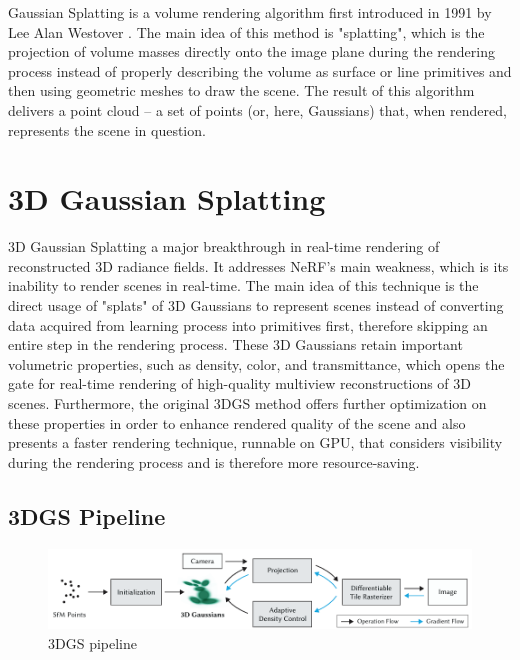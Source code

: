Gaussian Splatting is a volume rendering algorithm first introduced in 1991 by Lee Alan Westover \parencite{original-gs}. The main idea of this method is "splatting", which is the projection of volume masses directly onto the image plane during the rendering process instead of properly describing the volume as surface or line primitives and then using geometric meshes to draw the scene. The result of this algorithm delivers a point cloud -- a set of points (or, here, Gaussians) that, when rendered, represents the scene in question. 

\section{3D Gaussian Splatting}

3D Gaussian Splatting \parencite{3DGS} a major breakthrough in real-time rendering of reconstructed 3D radiance fields. It addresses NeRF's main weakness, which is its inability to render scenes in real-time. The main idea of this technique is the direct usage of "splats" of 3D Gaussians to represent scenes instead of converting data acquired from learning process into primitives first, therefore skipping an entire step in the rendering process. These 3D Gaussians retain important volumetric properties, such as density, color, and transmittance, which opens the gate for real-time rendering of high-quality multiview reconstructions of 3D scenes. Furthermore, the original 3DGS method offers further optimization on these properties in order to enhance rendered quality of the scene and also presents a faster rendering technique, runnable on GPU, that considers visibility during the rendering process and is therefore more resource-saving. 

\subsection{3DGS Pipeline}

\begin{figure}[h]
    \centering
    \includegraphics[width=1.0\linewidth]{figures/3dgs-optimizer-pipeline.png}
    \caption{3DGS pipeline}
    \label{fig:3dgs-optimizer-pipeline}
\end{figure}

